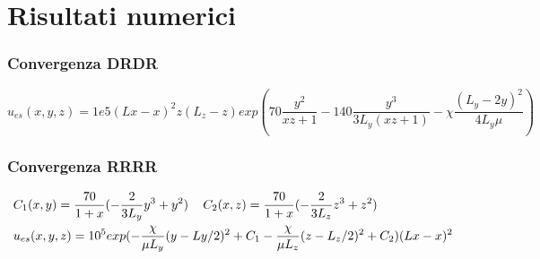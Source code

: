 \section{Risultati numerici}
\begin{frame}
\tableofcontents[currentsection]
\end{frame}

\begin{frame}
\frametitle{Convergenza DRDR}
\begin{alertblock}{}
{\footnotesize
\begin{equation}
u_{es}(x,y,z)=1e5(Lx - x)^2z(L_z-z)exp\left(70\frac{y^2}{xz + 1} - 140\frac{y^3}{3L_y( x z + 1 )} - \chi\frac{(L_y - 2y)^2}{4L_y\mu }\right)
\end{equation}
}\end{alertblock}

\begin{figure}[!h]
\centering
{}
\label{fig:drdrconv}
\end{figure}
\end{frame}

\begin{frame}
\frametitle{Convergenza RRRR}
\begin{alertblock}{}
{\footnotesize
\begin{equation}
\begin{split}
& C_1(x,y)=\frac{70}{1+x}(-\frac{2}{3L_y} y^3+ y^2) \psp{7}
C_2(x,z)=\frac{70}{1+x}(-\frac{2}{3L_z}z^3+z^2) \\
& u_{es}(x,y,z)=10^5exp( - \frac{\chi}{\mu L_y} (y - Ly/2 )^2 + C_1  - \frac{\chi}{\mu L_z}(z - L_z/2 ) ^ 2 + C_2 )(Lx-x)^2 
\end{split}
\end{equation}
}\end{alertblock}
\begin{figure}[!h]
\centering
{}
\end{figure}

\end{frame}


